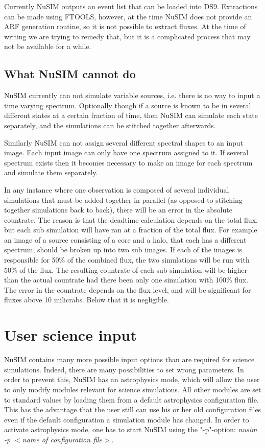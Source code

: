 Currently NuSIM outputs an event list that can be loaded into DS9. Extractions can be made using FTOOLS, however, at the time NuSIM does not provide an ARF generation routine, so it is not possible to extract fluxes. At the time of writing we are trying to remedy that, but it is a complicated process that may not be available for a while.

\subsection{What NuSIM cannot do}
NuSIM currently can not simulate variable sources, i.e. there is no way to input a time varying spectrum. Optionally though if a source is known to be in several different states at a certain fraction of time, then NuSIM can simulate each state separately, and the simulations can be stitched together afterwards.

Similarly NuSIM can not assign several different spectral shapes to an input image. Each input image can only have one spectrum assigned to it. If several spectrum exists then it becomes necessary to make an image for each spectrum and simulate them separately. 

In any instance where one observation is composed of several individual simulations that must be added together in parallel (as opposed to stitching together simulations back to back), there will be an error in the absolute countrate. The reason is that the deadtime calculation depends on the total flux, but each sub simulation will have ran at a fraction of the total flux. For example an image of a source consisting of a core and a halo, that each has a different spectrum, should be broken up into two sub images. If each of the images is responsible for 50\% of the combined flux, the two simulations will be run with 50\% of the flux. The resulting countrate of each sub-simulation will be higher than the actual countrate had there been only one simulation with 100\% flux. The error in the countrate depends on the flux level, and will be significant for fluxes above 10 milicrabs. Below that it is negligible.  


\section{User science input}

NuSIM contains many more possible input options than are required for science simulations. 
Indeed, there are many possibilities to set wrong parameters.
In order to prevent this, NuSIM has an astrophysics mode, which will allow the user to only modify modules relevant for science simulations.
All other modules are set to standard values by loading them from a default astrophysics configuration file.
This has the advantage that the user still can use his or her old configuration files even if the default configuration a simulation module has changed.
In order to activate astrophysics mode, one has to start NuSIM using the "-p"-option: \emph{nusim -p $<$name of configuration file$>$}. 

